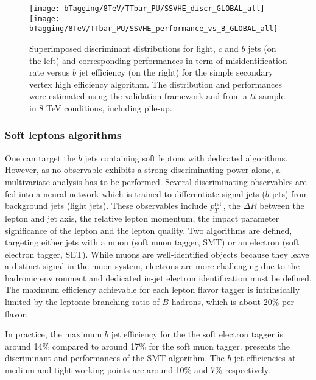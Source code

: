     \begin{figure}[th!]
        \centering
        \begin{minipage}{\textwidth}
        \texttt{[image: bTagging/8TeV/TTbar\_PU/SSVHE\_discr\_GLOBAL\_all]}
        \texttt{[image: bTagging/8TeV/TTbar\_PU/SSVHE\_performance\_vs\_B\_GLOBAL\_all]}
        \end{minipage}
        \caption{Superimposed discriminant distributions for light, $c$ and $b$ jets (on
        the left) and corresponding performances in term of misidentification rate versus $b$ jet efficiency
        (on the right) for the simple secondary vertex high efficiency algorithm.
        The distribution and performances were estimated using the validation framework and from
        a $t\bar{t}$ sample in 8 TeV conditions, including pile-up.}
        \label{fig:bTagging/perfSSV}
    \end{figure}

        \subsubsection{Soft leptons algorithms}

    One can target the $b$ jets containing soft leptons with dedicated algorithms. However,
    as no observable exhibits a strong discriminating power alone, a multivariate analysis
    has to be performed. Several discriminating observables are fed into a neural network
    which is trained to differentiate signal jets ($b$ jets) from background jets (light jets).
    These observables include $p_T^\text{rel.}$, the $\Delta R$ between the lepton and
    jet axis, the relative lepton momentum, the impact parameter significance of the lepton
    and the lepton quality. Two algorithms are defined, targeting either jets with a
    muon (soft muon tagger, SMT) or an electron (soft electron tagger, SET). While muons are
    well-identified objects because they leave a distinct signal in the muon system,
    electrons are more challenging due to the hadronic environment and dedicated in-jet
    electron identification must be defined. The maximum efficiency achievable for each
    lepton flavor tagger is intrinsically limited by the leptonic branching ratio of $B$ hadrons,
    which is about 20\% per flavor.

    In practice, the maximum $b$ jet efficiency for the the soft electron tagger is around
    14\% compared to around 17\% for the soft muon tagger.
     presents the discriminant and performances of the
    SMT algorithm. The $b$ jet efficiencies at medium and tight working points are around
    10\% and 7\% respectively.

